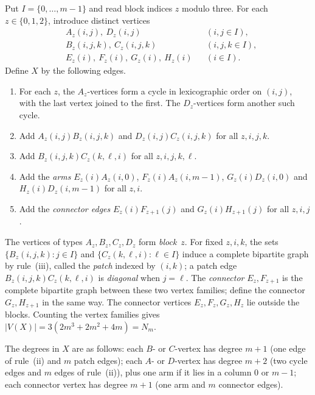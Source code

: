 \documentclass[11pt,letterpaper]{article}
\numberwithin{equation}{section}
\theoremstyle{plain}
\theoremstyle{definition}
\theoremstyle{remark}
\newcommand{\N}[1]{N_{#1}}
\begin{document}
Put $I=\{0,\dots,m-1\}$ and read block indices $z$ modulo three. For each $z\in\{0,1,2\}$, introduce distinct vertices
\begin{equation*}
  \begin{aligned}
    &A_z(i,j),\ D_z(i,j) && (i,j\in I),\\
    &B_z(i,j,k),\ C_z(i,j,k) && (i,j,k\in I),\\
    &E_z(i),\ F_z(i),\ G_z(i),\ H_z(i) && (i\in I).
  \end{aligned}
\end{equation*}
Define $X$ by the following edges.
\begin{enumerate}[label=(\roman*)]
  \item For each $z$, the $A_z$-vertices form a cycle in lexicographic order on $(i,j)$, with the last vertex joined to the first. The $D_z$-vertices form another such cycle.
  \item Add $A_z(i,j)B_z(i,j,k)$ and $D_z(i,j)C_z(i,j,k)$ for all $z,i,j,k$.
  \item Add $B_z(i,j,k)C_z(k,\ell,i)$ for all $z,i,j,k,\ell$.
  \item Add the \emph{arms} $E_z(i)A_z(i,0)$, $F_z(i)A_z(i,m-1)$, $G_z(i)D_z(i,0)$ and $H_z(i)D_z(i,m-1)$ for all $z,i$.
  \item Add the \emph{connector edges} $E_z(i)F_{z+1}(j)$ and $G_z(i)H_{z+1}(j)$ for all $z,i,j$.
\end{enumerate}
The vertices of types $A_z,B_z,C_z,D_z$ form \emph{block}~$z$. For fixed $z,i,k$, the sets $\{B_z(i,j,k): j\in I\}$ and $\{C_z(k,\ell,i): \ell\in I\}$ induce a complete bipartite graph by rule~(iii), called the \emph{patch} indexed by $(i,k)$; a patch edge $B_z(i,j,k)C_z(k,\ell,i)$ is \emph{diagonal} when $j=\ell$. The \emph{connector} $E_z,F_{z+1}$ is the complete bipartite graph between these two vertex families; define the connector $G_z,H_{z+1}$ in the same way. The connector vertices $E_z,F_z,G_z,H_z$ lie outside the blocks. Counting the vertex families gives $|V(X)|=3(2m^3+2m^2+4m)=\N{m}$.

The degrees in $X$ are as follows: each $B$- or $C$-vertex has degree $m+1$ (one edge of rule~(ii) and $m$ patch edges); each $A$- or $D$-vertex has degree $m+2$ (two cycle edges and $m$ edges of rule~(ii)), plus one arm if it lies in a column $0$ or $m-1$; each connector vertex has degree $m+1$ (one arm and $m$ connector edges).
\end{document}
